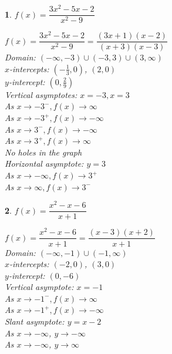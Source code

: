 \documentclass{amsbook}
\newtheorem{exc}{}
\newenvironment{ex}{\begin{exc}\normalfont}{\end{exc}}
\numberwithin{section}{chapter}
\numberwithin{equation}{chapter}
\begin{document}
\begin{multicols}{2}
\begin{ex}
		$f(x) = \dfrac{3x^2-5x-2}{x^{2} -9} $
	\begin{sol}
		$f(x) = \dfrac{3x^2-5x-2}{x^{2} -9} = \dfrac{(3x+1)(x-2)}{(x + 3)(x - 3)}$\\
		Domain: $(-\infty, -3) \cup (-3, 3) \cup (3, \infty)$\\
		$x$-intercepts: $\left(-\frac{1}{3}, 0 \right)$, $(2,0)$\\
		$y$-intercept:  $\left(0, \frac{2}{9} \right)$\\
		Vertical asymptotes: $x = -3, x = 3$\\
		As $x \rightarrow -3^{-}, f(x) \rightarrow \infty$\\
		As $x \rightarrow -3^{+}, f(x) \rightarrow -\infty$\\
		As $x \rightarrow 3^{-}, f(x) \rightarrow -\infty$\\
		As $x \rightarrow 3^{+}, f(x) \rightarrow \infty$\\
		No holes in the graph\\
		Horizontal asymptote: $y = 3$ \\
		As $x \rightarrow -\infty, f(x) \rightarrow 3^{+}$\\
		As $x \rightarrow \infty, f(x) \rightarrow 3^{-}$
	\end{sol}
\end{ex}

\begin{ex}
		$f(x) = \dfrac{x^2-x-6}{x+1}$
	\begin{sol}
		$f(x) = \dfrac{x^2-x-6}{x+1} = \dfrac{(x-3)(x+2)}{x+1}$\\
		Domain: $(-\infty, -1) \cup (-1, \infty)$\\
		$x$-intercepts:  $(-2,0)$, $(3,0)$\\
		$y$-intercept:  $(0,-6)$\\
		Vertical asymptote: $x = -1$\\
		As $x \rightarrow -1^{-}, f(x) \rightarrow \infty$\\
		As $x \rightarrow -1^{+}, f(x) \rightarrow -\infty$\\
		Slant asymptote: $y = x-2$ \\
		As $x \rightarrow -\infty$, $y\to -\infty$\\
As $x \rightarrow -\infty$, $y\to \infty$
	\end{sol}
\end{ex}


\end{multicols}
\end{document}

